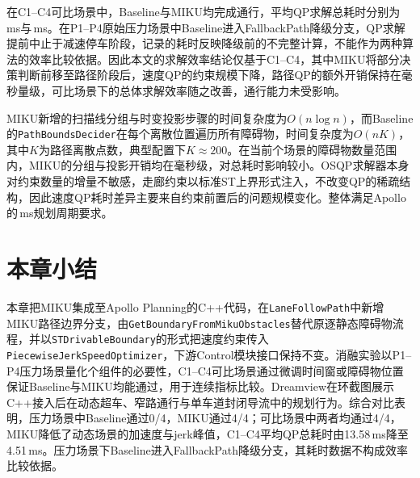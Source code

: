 在C1--C4可比场景中，Baseline与MIKU均完成通行，平均QP求解总耗时分别为\MComparableBaselineQpTotal\,ms与\MComparableMikuQpTotal\,ms。在P1--P4原始压力场景中Baseline进入FallbackPath降级分支，QP求解提前中止于减速停车阶段，记录的耗时反映降级前的不完整计算，不能作为两种算法的效率比较依据。因此本文的求解效率结论仅基于C1--C4，其中MIKU将部分决策判断前移至路径阶段后，速度QP的约束规模下降，路径QP的额外开销保持在毫秒量级，可比场景下的总体求解效率随之改善，通行能力未受影响。

MIKU新增的扫描线分组与时变投影步骤的时间复杂度为$O(n \log n)$，而Baseline的\texttt{PathBoundsDecider}在每个离散位置遍历所有障碍物，时间复杂度为$O(nK)$，其中$K$为路径离散点数，典型配置下$K \approx 200$。在当前\MScenarioTotal{}个场景的障碍物数量范围内，MIKU的分组与投影开销均在毫秒级，对总耗时影响较小。OSQP求解器本身对约束数量的增量不敏感，走廊约束以标准ST上界形式注入，不改变QP的稀疏结构，因此速度QP耗时差异主要来自约束前置后的问题规模变化。整体满足Apollo的\PlannerCycleMs\,ms规划周期要求。

\section{本章小结}

本章把MIKU集成至Apollo Planning的C++代码，在\texttt{LaneFollowPath}中新增MIKU路径边界分支，由\texttt{GetBoundaryFromMikuObstacles}替代原逐静态障碍物流程，并以\texttt{STDrivableBoundary}的形式把速度约束传入\texttt{PiecewiseJerkSpeedOptimizer}，下游Control模块接口保持不变。消融实验以P1--P4压力场景量化\AblationComponentTotal{}个组件的必要性，C1--C4可比场景通过微调时间窗或障碍物位置保证Baseline与MIKU均能通过，用于连续指标比较。Dreamview在环截图展示C++接入后在动态超车、窄路通行与单车道封闭导流中的规划行为。综合对比表明，压力场景中Baseline通过0/4，MIKU通过4/4；可比场景中两者均通过4/4，MIKU降低了动态场景的加速度与jerk峰值，C1--C4平均QP总耗时由13.58\,ms降至4.51\,ms。压力场景下Baseline进入FallbackPath降级分支，其耗时数据不构成效率比较依据。
